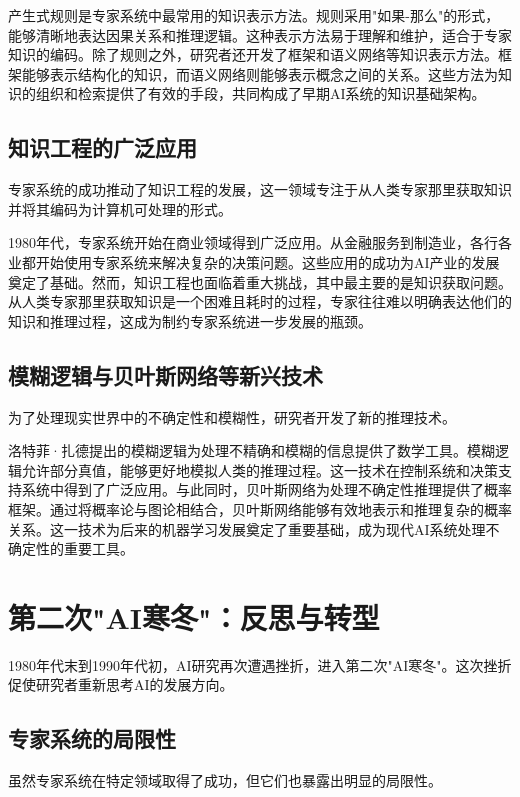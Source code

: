 产生式规则是专家系统中最常用的知识表示方法。规则采用"如果-那么"的形式，能够清晰地表达因果关系和推理逻辑。这种表示方法易于理解和维护，适合于专家知识的编码。除了规则之外，研究者还开发了框架和语义网络等知识表示方法。框架能够表示结构化的知识，而语义网络则能够表示概念之间的关系。这些方法为知识的组织和检索提供了有效的手段，共同构成了早期AI系统的知识基础架构。

\subsection{知识工程的广泛应用}

专家系统的成功推动了知识工程的发展，这一领域专注于从人类专家那里获取知识并将其编码为计算机可处理的形式。

1980年代，专家系统开始在商业领域得到广泛应用。从金融服务到制造业，各行各业都开始使用专家系统来解决复杂的决策问题。这些应用的成功为AI产业的发展奠定了基础。然而，知识工程也面临着重大挑战，其中最主要的是知识获取问题。从人类专家那里获取知识是一个困难且耗时的过程，专家往往难以明确表达他们的知识和推理过程，这成为制约专家系统进一步发展的瓶颈。

\subsection{模糊逻辑与贝叶斯网络等新兴技术}

为了处理现实世界中的不确定性和模糊性，研究者开发了新的推理技术。

洛特菲·扎德提出的模糊逻辑为处理不精确和模糊的信息提供了数学工具。模糊逻辑允许部分真值，能够更好地模拟人类的推理过程。这一技术在控制系统和决策支持系统中得到了广泛应用。与此同时，贝叶斯网络为处理不确定性推理提供了概率框架。通过将概率论与图论相结合，贝叶斯网络能够有效地表示和推理复杂的概率关系。这一技术为后来的机器学习发展奠定了重要基础，成为现代AI系统处理不确定性的重要工具。

\section{第二次"AI寒冬"：反思与转型}

1980年代末到1990年代初，AI研究再次遭遇挫折，进入第二次"AI寒冬"。这次挫折促使研究者重新思考AI的发展方向。

\subsection{专家系统的局限性}

虽然专家系统在特定领域取得了成功，但它们也暴露出明显的局限性。

